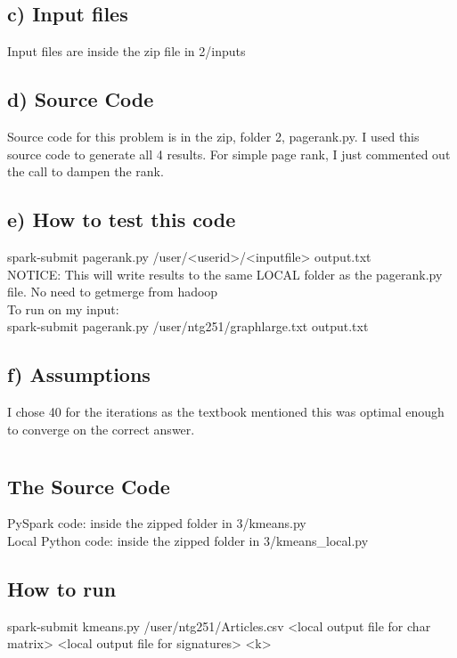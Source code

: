 \subsection*{c) Input files}
Input files are inside the zip file in 2/inputs

\subsection*{d) Source Code}
Source code for this problem is in the zip, folder 2, pagerank.py. I used this source code to generate all 4 results. For simple page rank, I just commented out the call to dampen the rank.

\subsection*{e) How to test this code}
spark-submit pagerank.py /user/<userid>/<inputfile> output.txt
\\
NOTICE: This will write results to the same LOCAL folder as the pagerank.py file. No need to getmerge from hadoop
\\
To run on my input:\\
spark-submit pagerank.py /user/ntg251/graphlarge.txt output.txt

\subsection*{f) Assumptions}
I chose 40 for the iterations as the textbook mentioned this was optimal enough to converge on the correct answer. 

\section*{}

\subsection*{The Source Code}
PySpark code: inside the zipped folder in 3/kmeans.py
\\
Local Python code: inside the zipped folder in 3/kmeans\_local.py

\subsection*{How to run}
spark-submit kmeans.py /user/ntg251/Articles.csv <local output file for char matrix> <local output file for signatures> <k>

